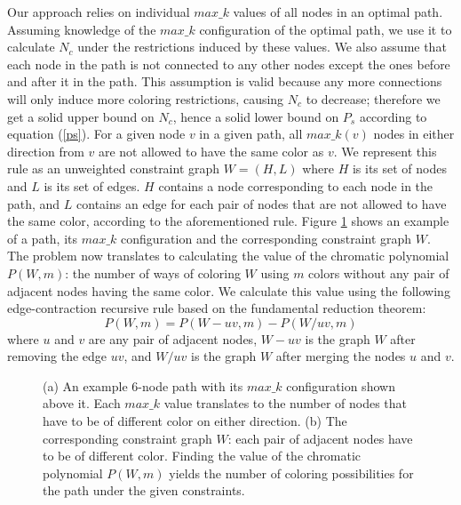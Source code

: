 \documentclass{ws-procs11x85}
\newcommand{\goodgap}{
        \hspace{\subfigtopskip}
        \hspace{\subfigbottomskip}
}
\begin{document}
Our approach relies on individual $max\_k$ values of all nodes in an optimal
path. Assuming knowledge of the $max\_k$ configuration of the optimal path, we
use it to calculate $N_c$ under the restrictions induced by these values. We
also assume that each node in the path is not connected to any other nodes
except the ones before and after it in the path. This assumption is valid
because any more connections will only induce more coloring restrictions,
causing $N_c$ to decrease; therefore we get a solid upper bound on $N_c$, hence
a solid lower bound on $P_s$ according to equation (\ref{ps}). For a given node
$v$ in a given path, all $max\_k(v)$ nodes in either direction from $v$ are not allowed to have the same
color as $v$. We represent this rule as an unweighted constraint graph $W = (H,
L)$ where $H$ is its set of nodes and $L$ is its set of edges. $H$ contains a
node corresponding to each node in the path, and $L$ contains an edge for each
pair of nodes that are not allowed to have the same color, according to the
aforementioned rule. Figure \ref{maxk} shows an example of a path, its $max\_k$
configuration and the corresponding constraint graph $W$. The problem now
translates to calculating the value of the chromatic polynomial $P(W, m)$: the
number of ways of coloring $W$ using $m$ colors without any pair of adjacent
nodes having the same color. We calculate this value using the following
edge-contraction recursive rule based on the fundamental reduction
theorem\cite{dong}:
\begin{equation}
P(W, m) = P(W - uv, m) - P(W / uv, m)
\label{eqchromatic}
\end{equation}
where $u$ and $v$ are any pair of adjacent nodes, $W - uv$ is the graph $W$
after removing the edge $uv$, and $W / uv$ is the graph $W$ after merging the
nodes $u$ and $v$.

\begin{figure}[t]
\centering
{}
\goodgap
{}
  \caption{(a) An example 6-node path with its $max\_k$ configuration
    shown above it. Each $max\_k$ value translates to the number of
    nodes that have to be of different color on either direction. (b)
    The corresponding constraint graph $W$: each pair of adjacent
    nodes have to be of different color. Finding the value of the
    chromatic polynomial $P(W, m)$ yields the number of coloring
    possibilities for the path under the given constraints.}
  \label{maxk}
\end{figure}
\end{document}
